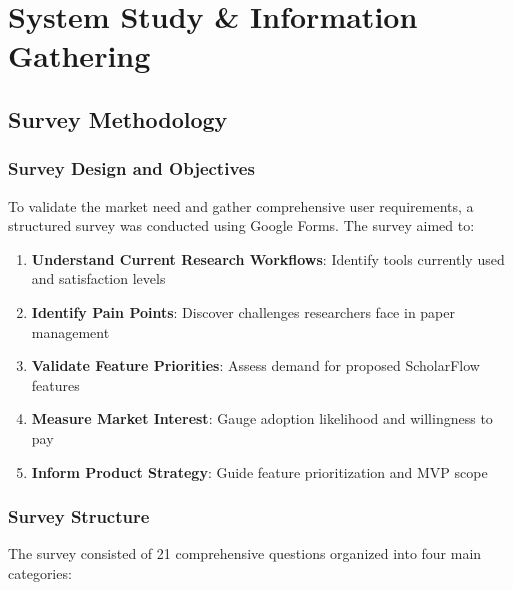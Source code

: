 \chapter{System Study \& Information Gathering}

\section{Survey Methodology}

\subsection{Survey Design and Objectives}

To validate the market need and gather comprehensive user requirements, a structured survey was conducted using Google Forms. The survey aimed to:

\begin{enumerate}
    \item \textbf{Understand Current Research Workflows}: Identify tools currently used and satisfaction levels
    \item \textbf{Identify Pain Points}: Discover challenges researchers face in paper management
    \item \textbf{Validate Feature Priorities}: Assess demand for proposed ScholarFlow features
    \item \textbf{Measure Market Interest}: Gauge adoption likelihood and willingness to pay
    \item \textbf{Inform Product Strategy}: Guide feature prioritization and MVP scope
\end{enumerate}

\subsection{Survey Structure}

The survey consisted of 21 comprehensive questions organized into four main categories:

